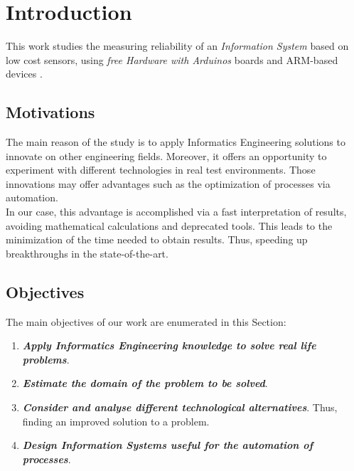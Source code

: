 
\chapter{Introduction}
\newpage


This work studies the measuring reliability of an \textit{Information System} based on low cost sensors, using \textit{free Hardware with Arduinos} \cite{noauthor_arduino_nodate-1, jjtorres_hardware_2014} boards and ARM-based devices \cite{ltd_leadership_nodate, ltd_-profile_nodate}.\\

\section{Motivations}

The main reason of the study is to apply Informatics Engineering solutions to innovate on other engineering fields. Moreover, it offers an opportunity to experiment with different technologies in real test environments. Those innovations may offer advantages such as the optimization of processes via automation. \\ 

In our case, this advantage is accomplished via a fast interpretation of results, avoiding mathematical calculations and deprecated tools. This leads to the minimization of the time needed to obtain results. Thus, speeding up breakthroughs in the state-of-the-art. \\

\section{Objectives}

The main objectives of our work are enumerated in this Section:

\begin{enumerate}

\item \textbf{\textit{Apply Informatics Engineering knowledge to solve real life problems}}.

\item \textbf{\textit{Estimate the domain of the problem to be solved}}. 

\item \textbf{\textit{Consider and analyse different technological alternatives}}. Thus, finding an improved solution to a problem. 

\item \textbf{\textit{Design Information Systems useful for the automation of processes}}.

\end{enumerate}

